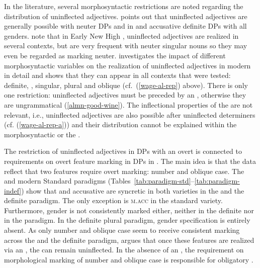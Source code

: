 \documentclass[output=paper,colorlinks,citecolor=brown]{langscibook}
\begin{document}
In the literature, several morphosyntactic restrictions are noted regarding the distribution of uninflected adjectives. \citet[19]{Staedele1927} points out that uninflected adjectives are generally possible with neuter DPs and in  and accusative definite DPs with all genders.
\citet[55, 110]{SolmsWegera1991} note that in Early New High , uninflected adjectives are realized in several contexts, but are very frequent with neuter singular nouns so they may even be regarded as marking neuter. \citet{Rehn2019} investigates the impact of different morphosyntactic variables on the realization of uninflected  adjectives in modern  in detail and shows that they can appear in all contexts that were tested: definite, , singular, plural and oblique (cf.~(\ref{wage-al-rep}) above). There is only one restriction: uninflected adjectives must be preceded by an , otherwise they are ungrammatical (\ref{almn-good-wine}). The inflectional properties of the  are not relevant, i.e., uninflected adjectives are also possible after uninflected determiners (cf. (\ref{wage-al-rep-a})) and their distribution cannot be explained within the morphosyntactic or the .

\ea {} \label{almn-good-wine}
\z
\z 

The restriction of uninflected adjectives in DPs with an overt  is connected to requirements on overt feature marking in  DPs in \citet[122--123]{Rehn2019}. The main idea is that the data reflect that two features require overt marking: number and oblique case. The  and modern Standard   paradigms (Tables~\ref{tab:paradigm-std}--\ref{tab:paradigm-indef}) show that  and accusative are syncretic in both varieties in the  and the definite paradigm. The only exception is \textsc{m.acc} in the standard variety. Furthermore, gender is not consistently marked either, neither in the definite nor in the  paradigm. In the definite plural paradigm, gender specification is entirely absent. As only number and oblique case seem to receive consistent marking across the  and the definite paradigm, \citet{Rehn2019} argues that once these features are realized via an , the  can remain uninflected. In the absence of an , the requirement on morphological marking of number and oblique case is responsible for obligatory .
\end{document}
